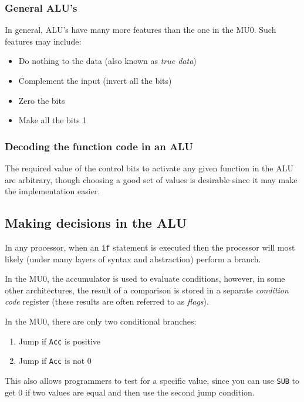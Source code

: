 \documentclass{article}
\begin{document}
\subsubsection{General ALU's}

In general, ALU's have many more features than the one in the MU0. Such features
may include:

\begin{itemize}
	\item Do nothing to the data (also known as {\it true data})
	\item Complement the input (invert all the bits)
	\item Zero the bits
	\item Make all the bits 1
\end{itemize}

\subsubsection{Decoding the function code in an ALU}

The required value of the control bits to activate any given function in the ALU
are arbitrary, though choosing a good set of values is desirable since it may
make the implementation easier.

\subsection{Making decisions in the ALU}

In any processor, when an {\tt if} statement is executed then the processor will
most likely (under many layers of syntax and abstraction) perform a branch.

In the MU0, the accumulator is used to evaluate conditions, however, in some
other architectures, the result of a comparison is stored in a separate {\it
condition code} register (these results are often referred to as {\it flags}).

In the MU0, there are only two conditional branches:

\begin{enumerate}
	\item Jump if {\tt Acc} is positive
	\item Jump if {\tt Acc} is not 0
\end{enumerate}

This also allows programmers to test for a specific value, since you can use
{\tt SUB} to get 0 if two values are equal and then use the second jump
condition.
\end{document}
